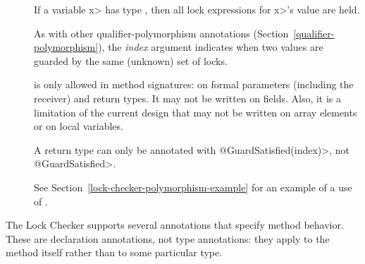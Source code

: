 \begin{description}

\item[]
  If a variable \<x> has type , then all
  lock expressions for \<x>'s value are held.

  As with other qualifier-polymorphism annotations
  (Section~\ref{qualifier-polymorphism}), the \emph{index} argument
  indicates when two values are guarded by the same (unknown) set of locks.

   is only allowed in method signatures:  on
  formal parameters (including the receiver) and return types.
  It may not be written on fields.  Also, it is a limitation of the
  current design that  may not be written on
  array elements or on local variables.

  A return type can only be annotated with \<@GuardSatisfied(index)>,
  not \<@GuardSatisfied>.

  See Section~\ref{lock-checker-polymorphism-example}
  for an example of a use of .


\end{description}



The Lock Checker supports several annotations that specify method behavior.
These are declaration annotations, not type annotations: they apply to the
method itself rather than to some particular type.


